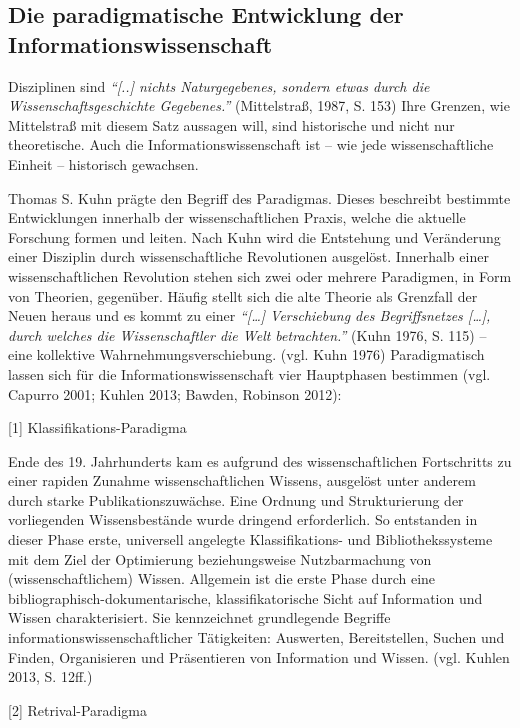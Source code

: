 \documentclass[a4paper,
fontsize=11pt,
oneside,
numbers=noperiodatend,
parskip=half-,
bibliography=totoc,
final
]{scrartcl}
\begin{document}
\subsection*{Die paradigmatische Entwicklung der
Informationswissenschaft}\label{die-paradigmatische-entwicklung-der-informationswissenschaft}

Disziplinen sind \emph{\enquote{{[}..{]} nichts Naturgegebenes, sondern
etwas durch die Wissenschaftsgeschichte Gegebenes.}} (Mittelstraß, 1987,
S. 153) Ihre Grenzen, wie Mittelstraß mit diesem Satz aussagen will,
sind historische und nicht nur theoretische. Auch die
Informationswissenschaft ist -- wie jede wissenschaftliche Einheit --
historisch gewachsen.

Thomas S. Kuhn prägte den Begriff des Paradigmas. Dieses beschreibt
bestimmte Entwicklungen innerhalb der wissenschaftlichen Praxis, welche
die aktuelle Forschung formen und leiten. Nach Kuhn wird die Entstehung
und Veränderung einer Disziplin durch wissenschaftliche Revolutionen
ausgelöst. Innerhalb einer wissenschaftlichen Revolution stehen sich
zwei oder mehrere Paradigmen, in Form von Theorien, gegenüber. Häufig
stellt sich die alte Theorie als Grenzfall der Neuen heraus und es kommt
zu einer \emph{\enquote{{[}\ldots{}{]} Verschiebung des Begriffsnetzes
{[}\ldots{}{]}, durch welches die Wissenschaftler die Welt betrachten.}}
(Kuhn 1976, S. 115) -- eine kollektive Wahrnehmungsverschiebung. (vgl.
Kuhn 1976) Paradigmatisch lassen sich für die Informationswissenschaft
vier Hauptphasen bestimmen (vgl. Capurro 2001; Kuhlen 2013; Bawden,
Robinson 2012):

{[}1{]} Klassifikations-Paradigma

Ende des 19. Jahrhunderts kam es aufgrund des wissenschaftlichen
Fortschritts zu einer rapiden Zunahme wissenschaftlichen Wissens,
ausgelöst unter anderem durch starke Publikationszuwächse. Eine Ordnung
und Strukturierung der vorliegenden Wissensbestände wurde dringend
erforderlich. So entstanden in dieser Phase erste, universell angelegte
Klassifikations- und Bibliothekssysteme mit dem Ziel der Optimierung
beziehungsweise Nutzbarmachung von (wissenschaftlichem) Wissen.
Allgemein ist die erste Phase durch eine
bibliographisch-dokumentarische, klassifikatorische Sicht auf
Information und Wissen charakterisiert. Sie kennzeichnet grundlegende
Begriffe informationswissenschaftlicher Tätigkeiten: Auswerten,
Bereitstellen, Suchen und Finden, Organisieren und Präsentieren von
Information und Wissen. (vgl. Kuhlen 2013, S. 12ff.)

{[}2{]} Retrival-Paradigma
\end{document}
